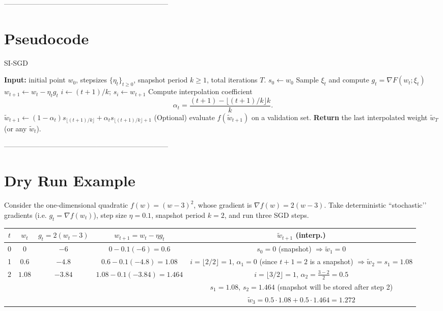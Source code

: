 \documentclass{article}
\begin{document}
---------------------------------------------------------------------

\section*{Pseudocode}
\begin{algorithm}[H]
\caption{SI‑SGD}
\begin{algorithmic}[1]
\STATE \textbf{Input:} initial point $w_0$, stepsizes $\{\eta_t\}_{t\ge0}$, snapshot period $k\ge1$, total iterations $T$.
\STATE $s_0 \leftarrow w_0$ 
    \STATE Sample $\xi_t$ and compute $g_t=\nabla F(w_t;\xi_t)$
    \STATE $w_{t+1}\leftarrow w_t-\eta_t g_t$ \hfill{}
        \STATE $i\leftarrow (t+1)/k$; $s_i\leftarrow w_{t+1}$ \hfill{}
    \ENDIF
    \STATE Compute interpolation coefficient
    \[
    \alpha_t = \frac{(t+1)-\lfloor (t+1)/k\rfloor k}{k}.
    \]
    \STATE $\tilde w_{t+1}\leftarrow (1-\alpha_t)s_{\lfloor (t+1)/k\rfloor}+ \alpha_t s_{\lfloor (t+1)/k\rfloor+1}$ \hfill{}
    \STATE (Optional) evaluate $f(\tilde w_{t+1})$ on a validation set.
\ENDFOR
\STATE \textbf{Return} the last interpolated weight $\tilde w_T$ (or any $\tilde w_t$).
\end{algorithmic}
\end{algorithm}

---------------------------------------------------------------------

\section*{Dry Run Example}
Consider the one‑dimensional quadratic $f(w)=(w-3)^2$, whose gradient is $\nabla f(w)=2(w-3)$.  
Take deterministic ``stochastic’’ gradients (i.e. $g_t=\nabla f(w_t)$), step size $\eta=0.1$, snapshot period $k=2$, and run three SGD steps.

\begin{center}
\begin{tabular}{c|c|c|c|c}
$t$ & $w_t$ & $g_t=2(w_t-3)$ & $w_{t+1}=w_t-\eta g_t$ & $\tilde w_{t+1}$ (interp.)\\ \hline
0 & $0$ & $-6$ & $0-0.1(-6)=0.6$ & $s_0=0$ (snapshot) $\Rightarrow \tilde w_1=0$\\
1 & $0.6$ & $-4.8$ & $0.6-0.1(-4.8)=1.08$ & $i=\lfloor 2/2\rfloor=1$, $\alpha_1=0$ (since $t+1=2$ is a snapshot) $\Rightarrow \tilde w_2=s_1=1.08$\\
2 & $1.08$ & $-3.84$ & $1.08-0.1(-3.84)=1.464$ & $i=\lfloor 3/2\rfloor=1$, $\alpha_2=\frac{3-2}{2}=0.5$\\
  &  &  &  & $s_1=1.08$, $s_2=1.464$ (snapshot will be stored after step 2)\\
  &  &  &  & $\tilde w_3=0.5\cdot1.08+0.5\cdot1.464=1.272$
\end{tabular}
\end{center}
\end{document}
